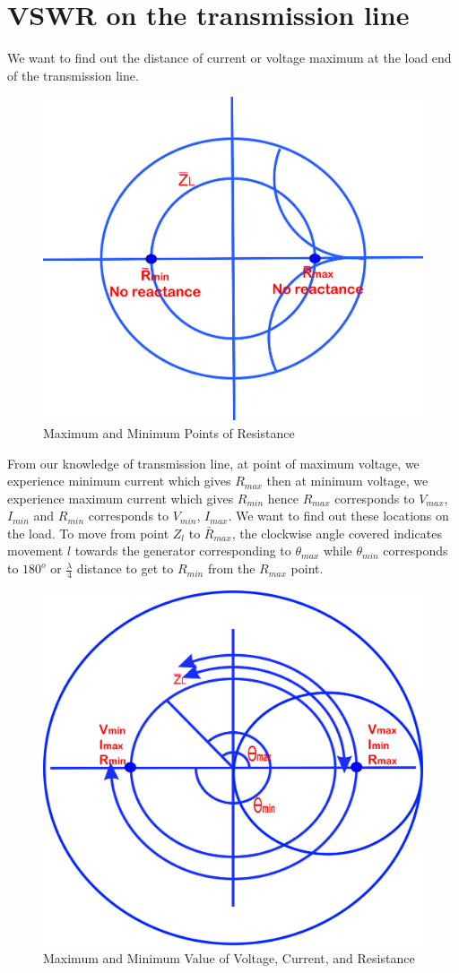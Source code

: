 \section{VSWR on the transmission line}

We want to find out the distance of current or voltage maximum at the load end of the transmission line.
\begin{figure}[h]
\centering
\includegraphics[width=0.7\linewidth]{./graphics/oijhgfdsa}
\caption{Maximum and Minimum Points of Resistance}
\label{fig:oijhgfdsa}
\end{figure}

From our knowledge of transmission line, at point of maximum voltage, we experience minimum current which gives $R_{max}$ then at minimum voltage, we experience maximum current which gives $R_{min}$ hence $R_{max}$ corresponds to $V_{max}$,  $I_{min}$ and  $R_{min}$ corresponds to  $V_{min}$, $I_{max}$.  We want to find out these locations on the load. To move from point $Z_{l}$ to $\bar{R}_{max}$, the clockwise angle covered indicates movement $l$ towards the generator corresponding to $\theta_{max}$ while $\theta_{min}$ corresponds to $180^o$ or $\frac{\lambda}{4}$ distance to get to $R_{min}$ from the $R_{max}$ point.
\begin{figure}[h]
\centering
\includegraphics[width=0.6\linewidth]{./graphics/lkjtresx}
\caption{Maximum and Minimum Value of Voltage, Current, and Resistance}
\label{fig:lkjtresx}
\end{figure}

